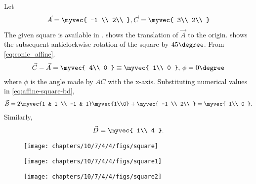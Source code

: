 Let
\begin{align}
\vec{A} = \myvec
{
-1 \\
 2\\
},
\vec{C} = 
\myvec
{
3\\
2\\
}
\end{align}
The given square is available in .
 shows the translation of $\vec{A}$ to the origin. 
 shows the subsequent anticlockwise rotation of the square by $45\degree$.
From
	\eqref{eq:conic_affine}.
\begin{align}
\vec{C} - \vec{A} = \myvec{
4\\
0
} \equiv 
\myvec{
1\\
0
},\,
\phi= 0\degree
\end{align}
		where
$\phi$ is the angle made by $AC$ with the x-axis.
Substituting numerical values in 
	\eqref{eq:affine-square-bd},
\begin{align}
	\vec{B}
	=2\myvec{1 & 1 \\ -1 & 1}\myvec{1\\0}+
\myvec
{
-1 \\
 2\\
}
=
\myvec{
1\\
0
}.
		\end{align}
		Similarly,
\begin{align}
\vec{D} = 
\myvec{
1\\
4
}.
\end{align}
\begin{figure}[H]
	\begin{center} 
	    \texttt{[image: chapters/10/7/4/4/figs/square]}
	\end{center}
\caption{}
\label{fig:7/4/4/4Fig1}
\end{figure}
\begin{figure}[H]
	\begin{center} 
	    \texttt{[image: chapters/10/7/4/4/figs/square1]}
	\end{center}
\caption{}
\label{fig:7/4/4/4Fig2}
\end{figure}
\begin{figure}[H]
	\begin{center} 
	    \texttt{[image: chapters/10/7/4/4/figs/square2]}
	\end{center}
\caption{}
\label{fig:7/4/4/4Fig3}
\end{figure}
